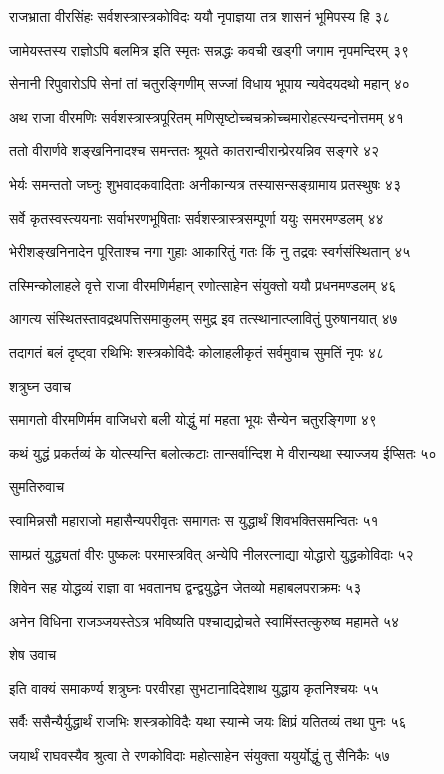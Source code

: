 राजभ्राता वीरसिंहः सर्वशस्त्रास्त्रकोविदः
ययौ नृपाज्ञया तत्र शासनं भूमिपस्य हि ३८

जामेयस्तस्य राज्ञोऽपि बलमित्र इति स्मृतः
सन्नद्धः कवची खड्गी जगाम नृपमन्दिरम् ३९

सेनानी रिपुवारोऽपि सेनां तां चतुरङ्गिणीम्
सज्जां विधाय भूपाय न्यवेदयदथो महान् ४०

अथ राजा वीरमणिः सर्वशस्त्रास्त्रपूरितम्
मणिसृष्टोच्चचक्रोच्चमारोहत्स्यन्दनोत्तमम् ४१

ततो वीरार्णवे शङ्खनिनादश्च समन्ततः
श्रूयते कातरान्वीरान्प्रेरयन्निव सङ्गरे ४२

भेर्यः समन्ततो जघ्नुः शुभवादकवादिताः
अनीकान्यत्र तस्यासन्सङ्ग्रामाय प्रतस्थुषः ४३

सर्वे कृतस्वस्त्ययनाः सर्वाभरणभूषिताः
सर्वशस्त्रास्त्रसम्पूर्णा ययुः समरमण्डलम् ४४

भेरीशङ्खनिनादेन पूरिताश्च नगा गुहाः
आकारितुं गतः किं नु तद्रवः स्वर्गसंस्थितान् ४५

तस्मिन्कोलाहले वृत्ते राजा वीरमणिर्महान्
रणोत्साहेन संयुक्तो ययौ प्रधनमण्डलम् ४६

आगत्य संस्थितस्तावद्रथपत्तिसमाकुलम्
समुद्र इव तत्स्थानात्प्लावितुं पुरुषानयात् ४७

तदागतं बलं दृष्ट्वा रथिभिः शस्त्रकोविदैः
कोलाहलीकृतं सर्वमुवाच सुमतिं नृपः ४८

शत्रुघ्न उवाच

समागतो वीरमणिर्मम वाजिधरो बली
योद्धुं मां महता भूयः सैन्येन चतुरङ्गिणा ४९

कथं युद्धं प्रकर्तव्यं के योत्स्यन्ति बलोत्कटाः
तान्सर्वान्दिश मे वीरान्यथा स्याज्जय ईप्सितः ५०

सुमतिरुवाच

स्वामिन्नसौ महाराजो महासैन्यपरीवृतः
समागतः स युद्धार्थं शिवभक्तिसमन्वितः ५१

साम्प्रतं युद्ध्यतां वीरः पुष्कलः परमास्त्रवित्
अन्येपि नीलरत्नाद्या योद्धारो युद्धकोविदाः ५२

शिवेन सह योद्धव्यं राज्ञा वा भवतानघ
द्वन्द्वयुद्धेन जेतव्यो महाबलपराक्रमः ५३

अनेन विधिना राजञ्जयस्तेऽत्र भविष्यति
पश्चाद्यद्रोचते स्वामिंस्तत्कुरुष्व महामते ५४

शेष उवाच

इति वाक्यं समाकर्ण्य शत्रुघ्नः परवीरहा
सुभटानादिदेशाथ युद्धाय कृतनिश्चयः ५५

सर्वैः ससैन्यैर्युद्धार्थं राजभिः शस्त्रकोविदैः
यथा स्यान्मे जयः क्षिप्रं यतितव्यं तथा पुनः ५६

जयार्थं राघवस्यैव श्रुत्वा ते रणकोविदाः
महोत्साहेन संयुक्ता ययुर्योद्धुं तु सैनिकैः ५७

